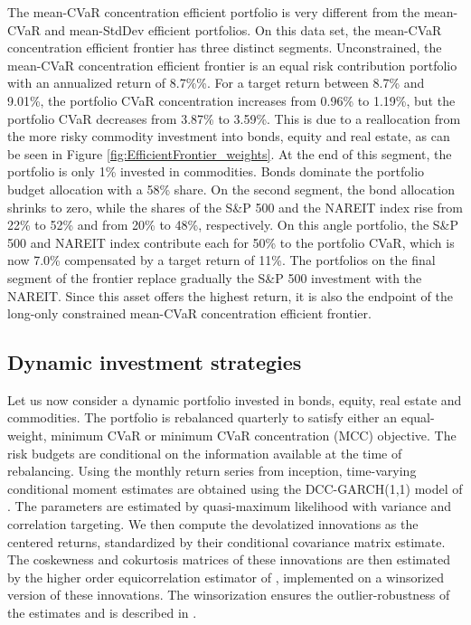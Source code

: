 \documentclass[12pt,a4paper]{article}
\begin{document}
The mean-CVaR concentration efficient portfolio is very different from the mean-CVaR and mean-StdDev efficient portfolios. On this data set, the mean-CVaR concentration efficient frontier has three distinct segments. Unconstrained, the mean-CVaR concentration efficient frontier is an equal risk contribution portfolio with an annualized return of 8.7\%\%. For a target return between 8.7\% and 9.01\%, the portfolio CVaR concentration increases from 0.96\% to 1.19\%, but the portfolio CVaR decreases from 3.87\% to 3.59\%. This is due to a reallocation from the more risky commodity investment into bonds, equity and real estate, as can be seen in Figure \ref{fig:EfficientFrontier_weights}. At the end of this segment, the portfolio is only 1\% invested in commodities. Bonds dominate the portfolio budget allocation with a 58\% share. On the second segment, the bond allocation shrinks to zero, while the shares of the S\&P 500 and the NAREIT index rise from 22\% to 52\% and from 20\% to 48\%, respectively. On this angle portfolio, the S\&P 500 and NAREIT index contribute each for 50\% to the portfolio CVaR, which is now 7.0\% compensated by a target return of 11\%. The portfolios on the final segment of the frontier replace gradually the S\&P 500 investment with the NAREIT. Since this asset offers the highest return, it is also the endpoint of the long-only constrained mean-CVaR concentration efficient frontier.

\clearpage
\subsection{Dynamic investment strategies}\label{subsec:dynamic}

Let us now consider a dynamic portfolio invested in bonds, equity, real estate and commodities. The portfolio is rebalanced quarterly to satisfy either an equal-weight, minimum CVaR or minimum CVaR concentration (MCC) objective. The risk budgets are conditional on the information available at the time of rebalancing. Using the monthly return series from inception, time-varying conditional moment estimates are obtained using the DCC-GARCH(1,1) model of \citet{EngleDCC02}.  The parameters are estimated by quasi-maximum likelihood with variance and correlation targeting.  We then compute the devolatized innovations as the centered returns, standardized by their conditional covariance matrix estimate.  The coskewness and cokurtosis matrices of these innovations are then estimated by the higher order equicorrelation estimator of \citet{MartelliniZiemann2010}, implemented on a winsorized version of these innovations. The winsorization ensures the outlier-robustness of the estimates and is described in \citet{Boudt2007}.
\end{document}
